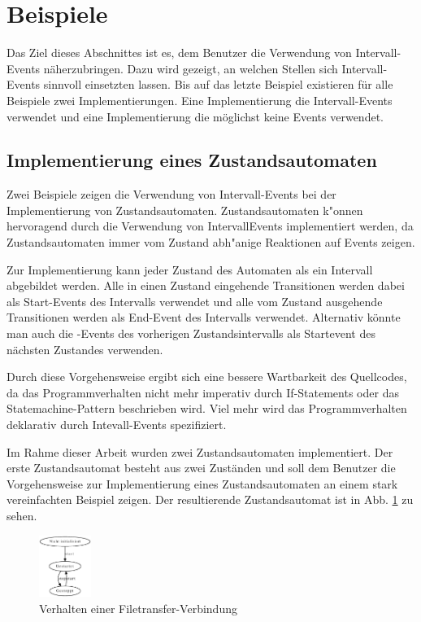 \section{Beispiele}

Das Ziel dieses Abschnittes ist es, dem Benutzer die Verwendung von
Intervall-Events näherzubringen. Dazu wird gezeigt, an welchen Stellen sich
Intervall-Events sinnvoll einsetzten lassen. Bis auf das letzte Beispiel
existieren für alle Beispiele zwei Implementierungen. Eine Implementierung die
Intervall-Events verwendet und eine Implementierung die möglichst keine Events
verwendet.

\subsection{Implementierung eines Zustandsautomaten}
Zwei Beispiele zeigen die Verwendung von Intervall-Events bei der
Implementierung von Zustandsautomaten. Zustandsautomaten k"onnen hervoragend
durch die Verwendung von IntervallEvents implementiert werden, da
Zustandsautomaten immer vom Zustand abh"anige Reaktionen auf Events zeigen.

Zur Implementierung kann jeder Zustand des Automaten als ein Intervall
abgebildet werden. Alle in einen Zustand eingehende Transitionen werden dabei
als Start-Events des Intervalls verwendet und alle vom Zustand ausgehende
Transitionen werden als End-Event des Intervalls verwendet. Alternativ könnte
man auch die \after{}-Events des vorherigen Zustandsintervalls als Startevent
des nächsten Zustandes verwenden.

Durch diese Vorgehensweise ergibt sich eine bessere Wartbarkeit des
Quellcodes, da das Programmverhalten nicht mehr imperativ durch If-Statements
oder das Statemachine-Pattern beschrieben wird. Viel mehr wird das
Programmverhalten deklarativ durch Intevall-Events spezifiziert.

Im Rahme dieser Arbeit wurden zwei Zustandsautomaten implementiert. Der erste
Zustandsautomat besteht aus zwei Zuständen und soll dem Benutzer die
Vorgehensweise zur Implementierung eines Zustandsautomaten an einem stark
vereinfachten Beispiel zeigen. Der resultierende Zustandsautomat ist in Abb.
\ref{filetransfer_behaviour} zu sehen.

\begin{figure}[htp]
\begin{center}
  \includegraphics[width=0.15\textwidth]{graphics/tcp_stm.dot.eps}
  \caption{Verhalten einer Filetransfer-Verbindung}
  \label{filetransfer_behaviour}
\end{center}
\end{figure}



